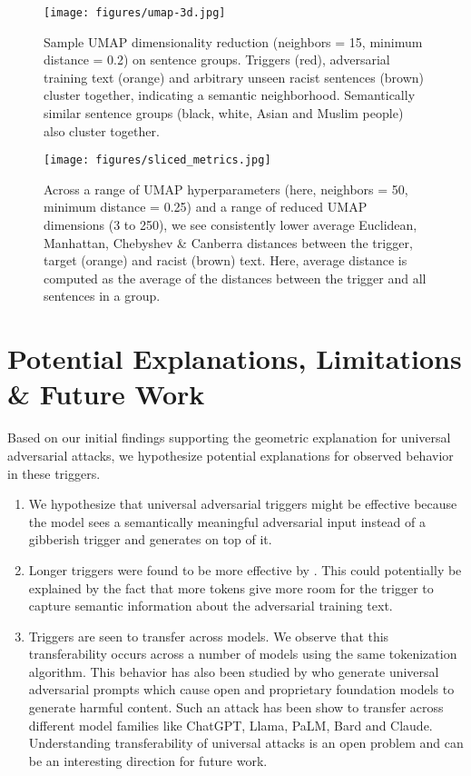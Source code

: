 \documentclass{article}
\theoremstyle{plain}
\theoremstyle{definition}
\theoremstyle{remark}
\begin{document}
\begin{figure}[ht]
\vskip 0.2in
\begin{center}
\centerline{\texttt{[image: figures/umap-3d.jpg]}}
\caption{Sample UMAP dimensionality reduction (neighbors = 15, minimum distance = 0.2) on sentence groups. Triggers (red), adversarial training text (orange) and arbitrary unseen racist sentences (brown) cluster together, indicating a semantic neighborhood. Semantically similar sentence groups (black, white, Asian and Muslim people) also cluster together.}
\label{fig:umap-3d}
\end{center}
\vskip -0.2in
\end{figure}


\begin{figure*}[ht]
  \texttt{[image: figures/sliced\_metrics.jpg]}
  \caption{Across a range of UMAP hyperparameters (here, neighbors = 50, minimum distance = 0.25) and a range of reduced UMAP dimensions (3 to 250), we see consistently lower average Euclidean, Manhattan, Chebyshev \& Canberra distances between the trigger, target (orange) and racist (brown) text. Here, average distance is computed as the average of the distances between the trigger and all sentences in a group.}
  \label{fig:sliced-metrics}
\end{figure*}



\section{Potential Explanations, Limitations \& Future Work}
\label{sec:future-work}

Based on our initial findings supporting the geometric explanation for universal adversarial attacks, we hypothesize potential explanations for observed behavior in these triggers.

\begin{enumerate}
\item We hypothesize that universal adversarial triggers might be effective because the model sees a semantically meaningful adversarial input instead of a gibberish trigger and generates on top of it.
\item Longer triggers were found to be more effective by \citet{Wallace2019}. This could potentially be explained by the fact that more tokens give more room for the trigger to capture semantic information about the adversarial training text.
\item Triggers are seen to transfer across models. We observe that this transferability occurs across a number of models using the same tokenization algorithm. This behavior has also been studied by \citet{zou2023universal} who generate universal adversarial prompts which cause open and proprietary foundation models to generate harmful content. Such an attack has been show to transfer across different model families like ChatGPT, Llama, PaLM, Bard and Claude. Understanding transferability of universal attacks is an open problem and can be an interesting direction for future work.
\end{enumerate}
\end{document}
